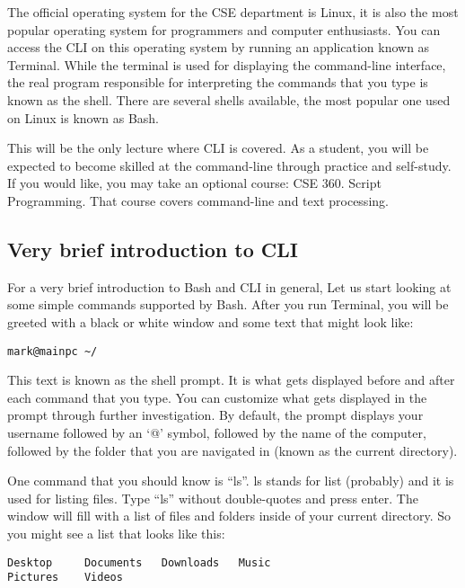 \documentclass[a4paper,12pt]{article}
\begin{document}
The official operating system for the CSE department is Linux, it is also the most popular operating system for programmers and computer enthusiasts. You can access the CLI on this operating system by running an application known as Terminal. While the terminal is used for displaying the command-line interface, the real program responsible for interpreting the commands that you type is known as the shell. There are several shells available, the most popular one used on Linux is known as Bash.

This will be the only lecture where CLI is covered. As a student, you will be expected to become skilled at the command-line through practice and self-study. If you would like, you may take an optional course: CSE 360. Script Programming. That course covers command-line and text processing.


\subsection*{Very brief introduction to CLI}

For a very brief introduction to Bash and CLI in general, Let us start looking at some simple commands supported by Bash. After you run Terminal, you will be greeted with a black or white window and some text that might look like:

\begin{lstlisting}
mark@mainpc ~/
\end{lstlisting}

This text is known as the shell prompt. It is what gets displayed before and after each command that you type. You can customize what gets displayed in the prompt through further investigation. By default, the prompt displays your username followed by an `@' symbol, followed by the name of the computer, followed by the folder that you are navigated in (known as the current directory).

One command that you should know is ``ls''. ls stands for list (probably) and it is used for listing files. Type ``ls'' without double-quotes and press enter. The window will fill with a list of files and folders inside of your current directory. So you might see a list that looks like this:

\begin{lstlisting}
Desktop		Documents	Downloads	Music
Pictures	Videos
\end{lstlisting}
\end{document}
